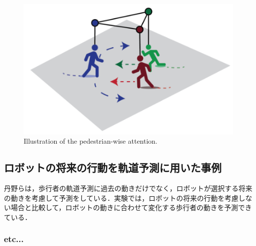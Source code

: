 \begin{figure}[hbtp]
     \centering
    \includegraphics[keepaspectratio, scale=0.65]
         {images/s-bigat.png}
    \caption{Illustration of the pedestrian-wise attention.\protect\footnotemark[3]}
    \label{Fig:s-bigat}
\end{figure}

\protect{}

\subsection{ロボットの将来の行動を軌道予測に用いた事例}
丹野らは，歩行者の軌道予測に過去の動きだけでなく，ロボットが選択する将来の動きを考慮して予測をしている．実験では，ロボットの将来の行動を考慮しない場合と比較して，ロボットの動きに合わせて変化する歩行者の動きを予測できている．

\subsubsection{etc...}
\newpage
